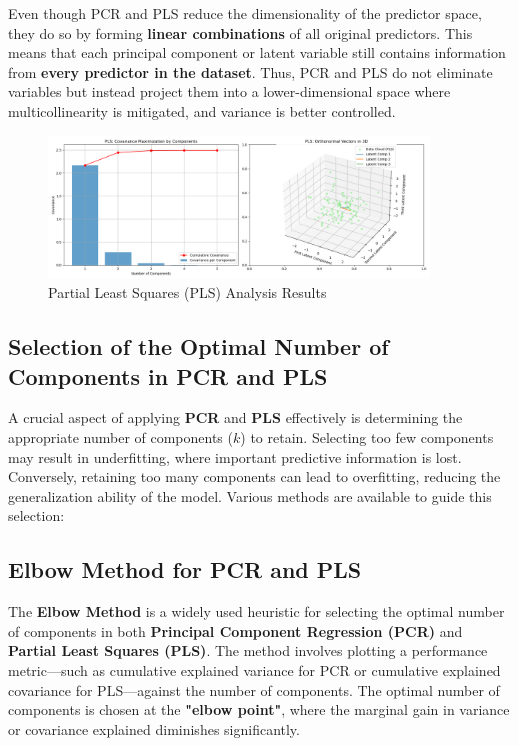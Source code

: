 \documentclass[11pt,twoside,a4paper]{article}
\begin{document}
Even though PCR and PLS reduce the dimensionality of the predictor space, they do so by forming \textbf{linear combinations} of all original predictors. This means that each principal component or latent variable still contains information from \textbf{every predictor in the dataset}. Thus, PCR and PLS do not eliminate variables but instead project them into a lower-dimensional space where multicollinearity is mitigated, and variance is better controlled.


\begin{figure}[H]
    \centering
    \includegraphics[width=0.9\textwidth]{PLS_Selected_Analysis.png}
    \caption{Partial Least Squares (PLS) Analysis Results}
    \label{fig:PLS_analysis}
\end{figure}



\subsection{Selection of the Optimal Number of Components in PCR and PLS}
A crucial aspect of applying \textbf{PCR} and \textbf{PLS} effectively is determining the appropriate number of components (\( k \)) to retain. Selecting too few components may result in underfitting, where important predictive information is lost. Conversely, retaining too many components can lead to overfitting, reducing the generalization ability of the model. Various methods are available to guide this selection:
\subsection{Elbow Method for PCR and PLS}
The \textbf{Elbow Method} is a widely used heuristic for selecting the optimal number of components in both \textbf{Principal Component Regression (PCR)} and \textbf{Partial Least Squares (PLS)}. The method involves plotting a performance metric—such as cumulative explained variance for PCR or cumulative explained covariance for PLS—against the number of components. The optimal number of components is chosen at the \textbf{"elbow point"}, where the marginal gain in variance or covariance explained diminishes significantly.
\end{document}
